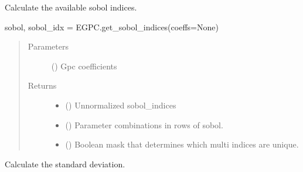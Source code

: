 \documentclass[letterpaper,10pt,english,openany,oneside]{sphinxmanual}
\begin{document}
\begin{fulllineitems}

\begin{fulllineitems}
\label{\detokenize{pygpc:pygpc.EGPC.EGPC.get_sobol_indices}}
Calculate the available sobol indices.

sobol, sobol\_idx = EGPC.get\_sobol\_indices(coeffs=None)
\begin{quote}\begin{description}
\item[{Parameters}] \leavevmode
{} (\sphinxstyleliteralemphasis{\sphinxupquote{{[}}}\sphinxstyleliteralemphasis{\sphinxupquote{{]} }}\sphinxstyleliteralemphasis{\sphinxupquote{, }}\sphinxstyleliteralemphasis{\sphinxupquote{, }}) \textendash{} Gpc coefficients

\item[{Returns}] \leavevmode
\begin{itemize}
\item {} 
 () \textendash{} Unnormalized sobol\_indices

\item {} 
 () \textendash{} Parameter combinations in rows of sobol.

\item {} 
 () \textendash{} Boolean mask that determines which multi indices are unique.

\end{itemize}


\end{description}\end{quote}

\end{fulllineitems}


\begin{fulllineitems}
\label{\detokenize{pygpc:pygpc.EGPC.EGPC.get_standard_deviation}}
Calculate the standard deviation.


\end{fulllineitems}
\end{fulllineitems}
\end{document}
